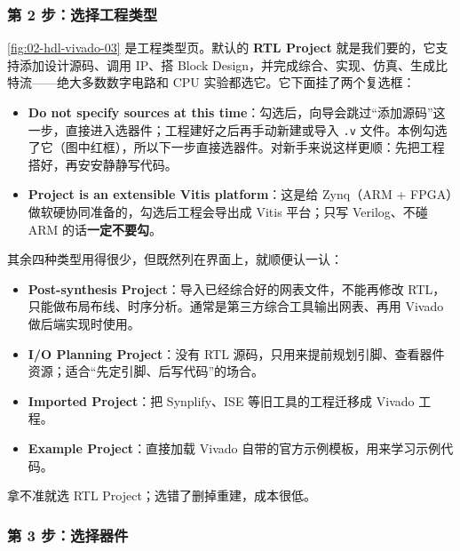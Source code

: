 \subsubsection*{第 2 步：选择工程类型}


\cref{fig:02-hdl-vivado-03} 是工程类型页。默认的 \textbf{RTL Project} 就是我们要的，它支持添加设计源码、调用 IP、搭 Block Design，并完成综合、实现、仿真、生成比特流——绝大多数数字电路和 CPU 实验都选它。它下面挂了两个复选框：

\begin{itemize}
  \item \textbf{Do not specify sources at this time}：勾选后，向导会跳过“添加源码”这一步，直接进入选器件；工程建好之后再手动新建或导入 \texttt{.v} 文件。本例勾选了它（图中红框），所以下一步直接选器件。对新手来说这样更顺：先把工程搭好，再安安静静写代码。
  \item \textbf{Project is an extensible Vitis platform}：这是给 Zynq（ARM + FPGA）做软硬协同准备的，勾选后工程会导出成 Vitis 平台；只写 Verilog、不碰 ARM 的话\textbf{一定不要勾}。
\end{itemize}

其余四种类型用得很少，但既然列在界面上，就顺便认一认：

\begin{itemize}
  \item \textbf{Post-synthesis Project}：导入已经综合好的网表文件，不能再修改 RTL，只能做布局布线、时序分析。通常是第三方综合工具输出网表、再用 Vivado 做后端实现时使用。
  \item \textbf{I/O Planning Project}：没有 RTL 源码，只用来提前规划引脚、查看器件资源；适合“先定引脚、后写代码”的场合。
  \item \textbf{Imported Project}：把 Synplify、ISE 等旧工具的工程迁移成 Vivado 工程。
  \item \textbf{Example Project}：直接加载 Vivado 自带的官方示例模板，用来学习示例代码。
\end{itemize}

拿不准就选 RTL Project；选错了删掉重建，成本很低。

\subsubsection*{第 3 步：选择器件}


